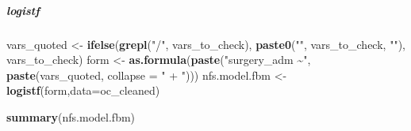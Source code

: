 \documentclass[
]{article}
\newenvironment{Shaded}{\begin{snugshade}}{\end{snugshade}}
\newcommand{\AttributeTok}[1]{\textcolor[rgb]{0.13,0.29,0.53}{#1}}
\newcommand{\FunctionTok}[1]{\textcolor[rgb]{0.13,0.29,0.53}{\textbf{#1}}}
\newcommand{\NormalTok}[1]{#1}
\newcommand{\OtherTok}[1]{\textcolor[rgb]{0.56,0.35,0.01}{#1}}
\newcommand{\StringTok}[1]{\textcolor[rgb]{0.31,0.60,0.02}{#1}}
\begin{document}
\subparagraph{logistf}\label{logistf}

\begin{Shaded}
\begin{Highlighting}[]
\NormalTok{vars\_quoted }\OtherTok{\textless{}{-}} \FunctionTok{ifelse}\NormalTok{(}\FunctionTok{grepl}\NormalTok{(}\StringTok{"/"}\NormalTok{, vars\_to\_check), }
                      \FunctionTok{paste0}\NormalTok{(}\StringTok{"\textasciigrave{}"}\NormalTok{, vars\_to\_check, }\StringTok{"\textasciigrave{}"}\NormalTok{), vars\_to\_check)}
\NormalTok{form }\OtherTok{\textless{}{-}} \FunctionTok{as.formula}\NormalTok{(}\FunctionTok{paste}\NormalTok{(}\StringTok{"surgery\_adm \textasciitilde{}"}\NormalTok{, }\FunctionTok{paste}\NormalTok{(vars\_quoted, }\AttributeTok{collapse =} \StringTok{" + "}\NormalTok{)))}
\NormalTok{nfs.model.fbm }\OtherTok{\textless{}{-}} \FunctionTok{logistf}\NormalTok{(form,}\AttributeTok{data=}\NormalTok{oc\_cleaned)}

\FunctionTok{summary}\NormalTok{(nfs.model.fbm)}
\end{Highlighting}
\end{Shaded}
\end{document}
